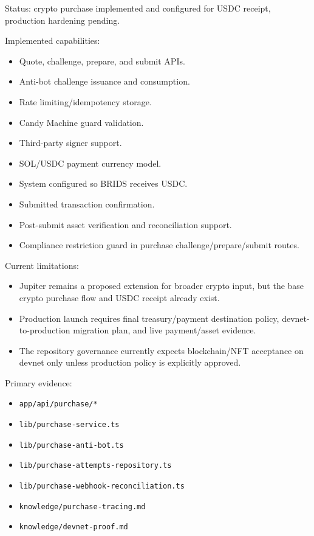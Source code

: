 \documentclass[
  10pt,
  letterpaper,
]{article}
\providecommand{\tightlist}{%
  \setlength{\itemsep}{0pt}\setlength{\parskip}{0pt}}
\let\oldtexttt\texttt
\renewcommand{\texttt}[1]{\oldtexttt{\small #1}}
\begin{document}
Status: crypto purchase implemented and configured for USDC receipt,
production hardening pending.

Implemented capabilities:

\begin{itemize}
\tightlist
\item
  Quote, challenge, prepare, and submit APIs.
\item
  Anti-bot challenge issuance and consumption.
\item
  Rate limiting/idempotency storage.
\item
  Candy Machine guard validation.
\item
  Third-party signer support.
\item
  SOL/USDC payment currency model.
\item
  System configured so BRIDS receives USDC.
\item
  Submitted transaction confirmation.
\item
  Post-submit asset verification and reconciliation support.
\item
  Compliance restriction guard in purchase challenge/prepare/submit
  routes.
\end{itemize}

Current limitations:

\begin{itemize}
\tightlist
\item
  Jupiter remains a proposed extension for broader crypto input, but the
  base crypto purchase flow and USDC receipt already exist.
\item
  Production launch requires final treasury/payment destination policy,
  devnet-to-production migration plan, and live payment/asset evidence.
\item
  The repository governance currently expects blockchain/NFT acceptance
  on devnet only unless production policy is explicitly approved.
\end{itemize}

Primary evidence:

\begin{itemize}
\tightlist
\item
  \texttt{app/api/purchase/*}
\item
  \texttt{lib/purchase-service.ts}
\item
  \texttt{lib/purchase-anti-bot.ts}
\item
  \texttt{lib/purchase-attempts-repository.ts}
\item
  \texttt{lib/purchase-webhook-reconciliation.ts}
\item
  \texttt{knowledge/purchase-tracing.md}
\item
  \texttt{knowledge/devnet-proof.md}
\end{itemize}
\end{document}
